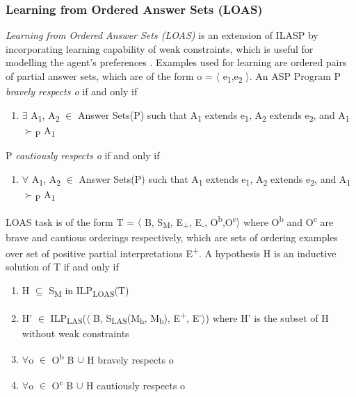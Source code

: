 \documentclass[12pt,twoside]{report}
\begin{document}
\subsubsection{Learning from Ordered Answer Sets (LOAS)}

\textit{Learning from Ordered Answer Sets (LOAS)} is an extension of ILASP by incorporating learning capability of weak constraints, which is useful for modelling the agent's preferences \cite{Law2015}.
Examples used for learning are ordered pairs of partial answer sets, which are of the form o = $\langle$ e\textsubscript{1},e\textsubscript{2} $\rangle$.  An ASP Program P \textit{bravely respects o } if and only if
\begin{enumerate}
\item $\exists$ A\textsubscript{1}, A\textsubscript{2} $\in$ Answer Sets(P) such that A\textsubscript{1} extends e\textsubscript{1}, A\textsubscript{2} extends e\textsubscript{2}, and A\textsubscript{1} $\succ$\textsubscript{P} A\textsubscript{1}
\end{enumerate}

P \textit{cautiously respects o } if and only if
\begin{enumerate}
\item $\forall$ A\textsubscript{1}, A\textsubscript{2} $\in$ Answer Sets(P) such that A\textsubscript{1} extends e\textsubscript{1}, A\textsubscript{2} extends e\textsubscript{2}, and A\textsubscript{1} $\succ$\textsubscript{P} A\textsubscript{1}
\end{enumerate}

LOAS task is of the form T = $\langle$ B, S\textsubscript{M}, E\textsubscript{+}, E\textsubscript{-}, O\textsuperscript{b},O\textsuperscript{c}$\rangle$ where O\textsuperscript{b} and O\textsuperscript{c} are brave and cautious orderings respectively, which are sets of ordering examples over set of positive partial interpretations E\textsuperscript{+}. A hypothesis H is an inductive solution of T if and only if
\begin{enumerate}
\item H $\subseteq$ S\textsubscript{M} in ILP\textsubscript{LOAS}(T)
\item H' $\in$ ILP\textsubscript{LAS}($\langle$ B, S\textsubscript{LAS}(M\textsubscript{h}, M\textsubscript{b}), E\textsuperscript{+}, E\textsuperscript{-}$\rangle$) where H' is the subset of H without weak constraints
\item $\forall$o $\in$ O\textsuperscript{b} B $\cup$ H bravely respects o
\item $\forall$o $\in$ O\textsuperscript{c} B $\cup$ H cautiously respects o
\end{enumerate}
\end{document}
